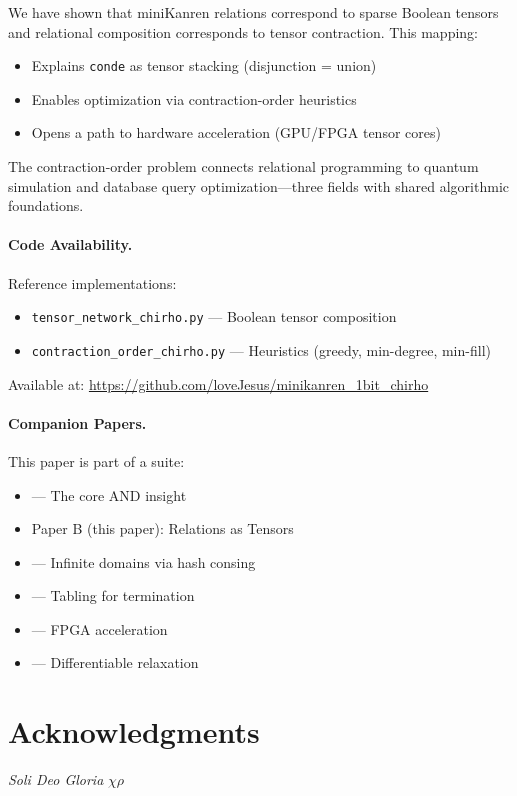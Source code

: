 \documentclass[11pt,a4paper]{article}
\begin{document}
We have shown that miniKanren relations correspond to sparse Boolean tensors and
relational composition corresponds to tensor contraction. This mapping:
\begin{itemize}
  \item Explains \texttt{conde} as tensor stacking (disjunction = union)
  \item Enables optimization via contraction-order heuristics
  \item Opens a path to hardware acceleration (GPU/FPGA tensor cores)
\end{itemize}

The contraction-order problem connects relational programming to quantum simulation
and database query optimization---three fields with shared algorithmic foundations.

\paragraph{Code Availability.}
Reference implementations:
\begin{itemize}
  \item \texttt{tensor\_network\_chirho.py} --- Boolean tensor composition
  \item \texttt{contraction\_order\_chirho.py} --- Heuristics (greedy, min-degree, min-fill)
\end{itemize}
Available at: \url{https://github.com/loveJesus/minikanren_1bit_chirho}

\paragraph{Companion Papers.}
This paper is part of a suite:
\begin{itemize}
  \item \paperA{} --- The core AND insight
  \item Paper B (this paper): Relations as Tensors
  \item \paperC{} --- Infinite domains via hash consing
  \item \paperD{} --- Tabling for termination
  \item \paperE{} --- FPGA acceleration
  \item \paperF{} --- Differentiable relaxation
\end{itemize}

\section*{Acknowledgments}

\standardacknowledgments





\vspace{1em}
\begin{center}
\textit{Soli Deo Gloria} $\chi\rho$
\end{center}
\end{document}
